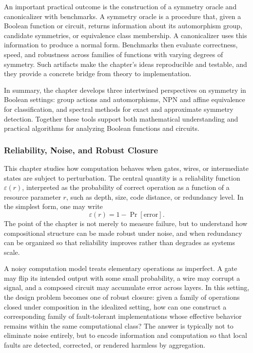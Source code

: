 \documentclass[11pt]{article}
\begin{document}
An important practical outcome is the construction of a symmetry oracle and canonicalizer with benchmarks. A symmetry oracle is a procedure that, given a Boolean function or circuit, returns information about its automorphism group, candidate symmetries, or equivalence class membership. A canonicalizer uses this information to produce a normal form. Benchmarks then evaluate correctness, speed, and robustness across families of functions with varying degrees of symmetry. Such artifacts make the chapter's ideas reproducible and testable, and they provide a concrete bridge from theory to implementation.

In summary, the chapter develops three intertwined perspectives on symmetry in Boolean settings: group actions and automorphisms, NPN and affine equivalence for classification, and spectral methods for exact and approximate symmetry detection. Together these tools support both mathematical understanding and practical algorithms for analyzing Boolean functions and circuits.


\subsubsection{Reliability, Noise, and Robust Closure}

This chapter studies how computation behaves when gates, wires, or intermediate states are subject to perturbation. The central quantity is a reliability function \(\varepsilon(r)\), interpreted as the probability of correct operation as a function of a resource parameter \(r\), such as depth, size, code distance, or redundancy level. In the simplest form, one may write
\[
\varepsilon(r) = 1 - \Pr[\text{error}].
\]
The point of the chapter is not merely to measure failure, but to understand how compositional structure can be made robust under noise, and when redundancy can be organized so that reliability improves rather than degrades as systems scale.

A noisy computation model treats elementary operations as imperfect. A gate may flip its intended output with some small probability, a wire may corrupt a signal, and a composed circuit may accumulate error across layers. In this setting, the design problem becomes one of robust closure: given a family of operations closed under composition in the idealized setting, how can one construct a corresponding family of fault-tolerant implementations whose effective behavior remains within the same computational class? The answer is typically not to eliminate noise entirely, but to encode information and computation so that local faults are detected, corrected, or rendered harmless by aggregation.
\end{document}
